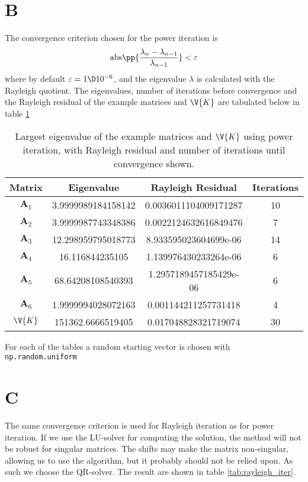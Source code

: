 \documentclass[a4paper,10pt]{article}
\begin{document}
	\section*{B}
	The convergence criterion chosen for the power iteration is
	\begin{equation}\label{key}
		\text{abs}\pp{\frac{\lambda_{n} - \lambda_{n-1}}{\lambda_{n-1}}} < \varepsilon
	\end{equation}
	where by default $ \varepsilon = 1\D 10^{-6} $, and the eigenvalue $ \lambda $ is calculated with the Rayleigh quotient. The eigenvalues, number of iterations before convergence and the Rayleigh residual of the example matrices and $ \V{K} $ are tabulated below in table \ref{tab:power_iter}
	\begin{table}[H]
		\centering
		\begin{tabular}{c|c|c|c}
			Matrix & Eigenvalue & Rayleigh Residual & Iterations \\
			\hline
			$ \textbf{A}_1 $ & 3.9999989184158142 & 0.0036011104009171287 & 10\\
			$ \textbf{A}_2 $ & 3.9999987743348386 & 0.0022124632616849476 & 7\\
			$ \textbf{A}_3 $ & 12.298959795018773 & 8.933595023604699e-06 & 14\\
			$ \textbf{A}_4 $ & 16.116844235105 & 1.139976430233264e-06 & 6\\
			$ \textbf{A}_5 $ & 68.64208108540393 & 1.2957189457185429e-06 & 6\\
			$ \textbf{A}_6 $ & 1.9999994028072163 & 0.001144211257731418 & 4\\
			$ \V{K} $ & 151362.6666519405 & 0.017048828321719074 & 30
		\end{tabular}
		\caption{Largest eigenvalue of the example matrices and $ \V{K} $ using power iteration, with Rayleigh residual and number of iterations until convergence shown.}
		\label{tab:power_iter}
	\end{table}
	For each of the tables a random starting vector is chosen with \texttt{np.random.uniform}
	
	\section*{C}
	The same convergence criterion is used for Rayleigh iteration as for power iteration. If we use the LU-solver for computing the solution, the method will not be robust for singular matrices. The shifts may make the matrix non-singular, allowing us to use the algorithm, but it probably should not be relied upon. As such we choose the QR-solver. The result are shown in table \ref{tab:rayleigh_iter}.
	
\end{document}
